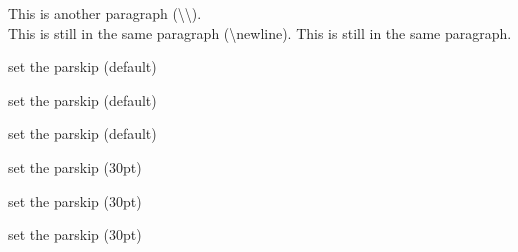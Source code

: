 \documentclass[twoside]{ctexart} %
\begin{document}
            \mbox{}

            This is another paragraph (\textbackslash \textbackslash).\\ %
            This is still in the same paragraph (\textbackslash newline).\newline %
            This is still in the same paragraph.
            
            \setlength{\parskip}{0pt plus 1pt} %

            set the parskip (default)

            set the parskip (default)

            set the parskip (default)

            {\setlength{\parskip}{30pt}
            
            set the parskip (30pt)

            set the parskip (30pt)

            set the parskip (30pt)
            }
\end{document}
